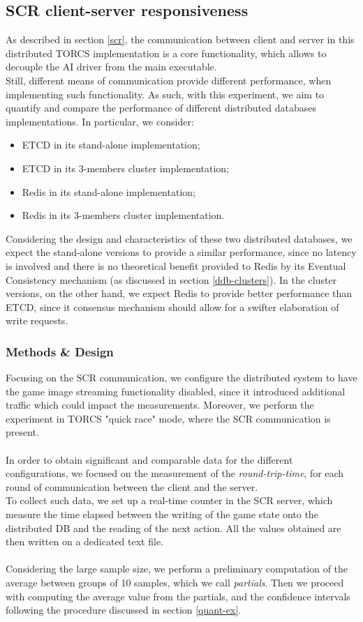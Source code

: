 \subsection{SCR client-server responsiveness}\label{scr-responsiveness-desc}
As described in section \ref{scr}, the communication between client and server in this distributed TORCS implementation is a core functionality, which allows to decouple the AI driver from the main executable. \\
Still, different means of communication provide different performance, when implementing such functionality. As such, with this experiment, we aim to quantify and compare the performance of different distributed databases implementations. In particular, we consider:
\begin{itemize}
	\item ETCD in its stand-alone implementation;
	\item ETCD in its 3-members cluster implementation;
	\item Redis in its stand-alone implementation;
	\item Redis in its 3-members cluster implementation.
\end{itemize}
Considering the design and characteristics of these two distributed databases, we expect the stand-alone versions to provide a similar performance, since no latency is involved and there is no theoretical benefit provided to Redis by its Eventual Consistency mechanism (as discussed in section \ref{ddb-clusters}). In the cluster versions, on the other hand, we expect Redis to provide better performance than ETCD, since it consensus mechanism should allow for a swifter elaboration of write requests.

\subsubsection{Methods \& Design}
Focusing on the SCR communication, we configure the distributed system to have the game image streaming functionality disabled, since it introduced additional traffic which could impact the measurements. Moreover, we perform the experiment in TORCS "quick race" mode, where the SCR communication is present. \\ \\
In order to obtain significant and comparable data for the different configurations, we focused on the measurement of the \textit{round-trip-time}, for each round of communication between the client and the server. \\
To collect such data, we set up a real-time counter in the SCR server, which measure the time elapsed between the writing of the game state onto the distributed DB and the reading of the next action. All the values obtained are then written on a dedicated text file. \\ \\
Considering the large sample size, we perform a preliminary computation of the average between groups of 10 samples, which we call \textit{partials}. Then we proceed with computing the average value from the partials, and the confidence intervals following the procedure discussed in section \ref{quant-ex}.

